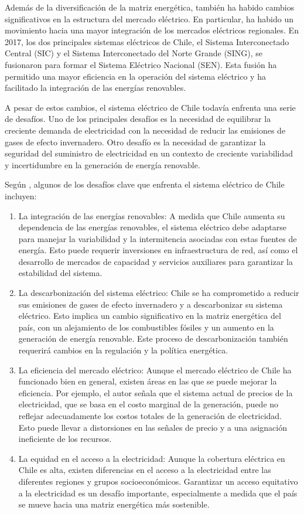 Además de la diversificación de la matriz energética, también ha habido cambios significativos en la estructura del mercado eléctrico. En particular, ha habido un movimiento hacia una mayor integración de los mercados eléctricos regionales. En 2017, los dos principales sistemas eléctricos de Chile, el Sistema Interconectado Central (SIC) y el Sistema Interconectado del Norte Grande (SING), se fusionaron para formar el Sistema Eléctrico Nacional (SEN). Esta fusión ha permitido una mayor eficiencia en la operación del sistema eléctrico y ha facilitado la integración de las energías renovables.
\vspace{2.5mm}

A pesar de estos cambios, el sistema eléctrico de Chile todavía enfrenta una serie de desafíos. Uno de los principales desafíos es la necesidad de equilibrar la creciente demanda de electricidad con la necesidad de reducir las emisiones de gases de efecto invernadero. Otro desafío es la necesidad de garantizar la seguridad del suministro de electricidad en un contexto de creciente variabilidad y incertidumbre en la generación de energía renovable.
\vspace{2.5mm}


Según , algunos de los desafíos clave que enfrenta el sistema eléctrico de Chile incluyen:
\begin{enumerate}
\item 
La integración de las energías renovables: A medida que Chile aumenta su dependencia de las energías renovables, el sistema eléctrico debe adaptarse para manejar la variabilidad y la intermitencia asociadas con estas fuentes de energía. Esto puede requerir inversiones en infraestructura de red, así como el desarrollo de mercados de capacidad y servicios auxiliares para garantizar la estabilidad del sistema.
\item 
La descarbonización del sistema eléctrico: Chile se ha comprometido a reducir sus emisiones de gases de efecto invernadero y a descarbonizar su sistema eléctrico. Esto implica un cambio significativo en la matriz energética del país, con un alejamiento de los combustibles fósiles y un aumento en la generación de energía renovable. Este proceso de descarbonización también requerirá cambios en la regulación y la política energética.
\item 
La eficiencia del mercado eléctrico: Aunque el mercado eléctrico de Chile ha funcionado bien en general, existen áreas en las que se puede mejorar la eficiencia. Por ejemplo, el autor señala que el sistema actual de precios de la electricidad, que se basa en el costo marginal de la generación, puede no reflejar adecuadamente los costos totales de la generación de electricidad. Esto puede llevar a distorsiones en las señales de precio y a una asignación ineficiente de los recursos.
\item 
La equidad en el acceso a la electricidad: Aunque la cobertura eléctrica en Chile es alta, existen diferencias en el acceso a la electricidad entre las diferentes regiones y grupos socioeconómicos. Garantizar un acceso equitativo a la electricidad es un desafío importante, especialmente a medida que el país se mueve hacia una matriz energética más sostenible.
\end{enumerate}

